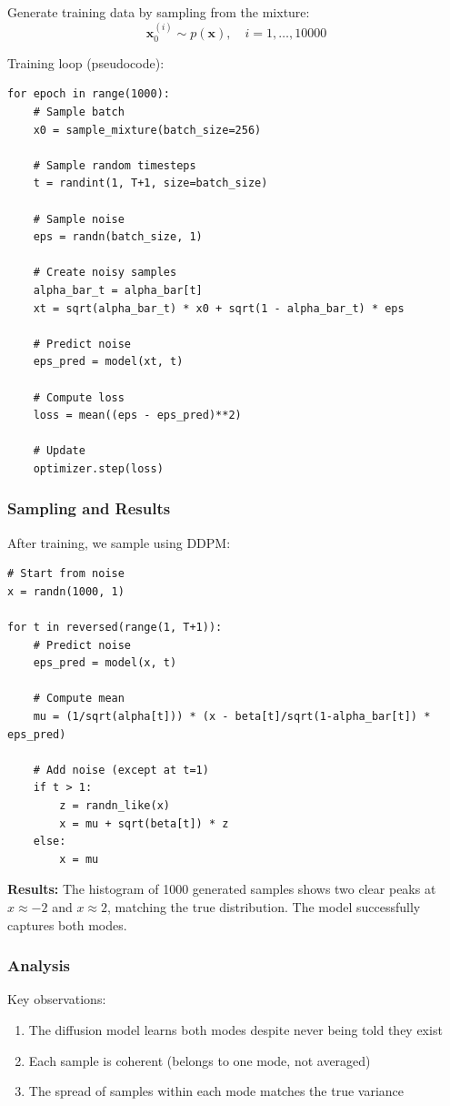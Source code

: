 Generate training data by sampling from the mixture:
\begin{equation}
\mathbf{x}_0^{(i)} \sim p(\mathbf{x}), \quad i = 1, \ldots, 10000
\label{eq:example1_data}
\end{equation}

Training loop (pseudocode):
\begin{verbatim}
for epoch in range(1000):
    # Sample batch
    x0 = sample_mixture(batch_size=256)

    # Sample random timesteps
    t = randint(1, T+1, size=batch_size)

    # Sample noise
    eps = randn(batch_size, 1)

    # Create noisy samples
    alpha_bar_t = alpha_bar[t]
    xt = sqrt(alpha_bar_t) * x0 + sqrt(1 - alpha_bar_t) * eps

    # Predict noise
    eps_pred = model(xt, t)

    # Compute loss
    loss = mean((eps - eps_pred)**2)

    # Update
    optimizer.step(loss)
\end{verbatim}

\subsubsection{Sampling and Results}

After training, we sample using DDPM:

\begin{verbatim}
# Start from noise
x = randn(1000, 1)

for t in reversed(range(1, T+1)):
    # Predict noise
    eps_pred = model(x, t)

    # Compute mean
    mu = (1/sqrt(alpha[t])) * (x - beta[t]/sqrt(1-alpha_bar[t]) * eps_pred)

    # Add noise (except at t=1)
    if t > 1:
        z = randn_like(x)
        x = mu + sqrt(beta[t]) * z
    else:
        x = mu
\end{verbatim}

\textbf{Results:} The histogram of 1000 generated samples shows two clear peaks at $x \approx -2$ and $x \approx 2$, matching the true distribution. The model successfully captures both modes.

\subsubsection{Analysis}

Key observations:
\begin{enumerate}
    \item The diffusion model learns both modes despite never being told they exist
    \item Each sample is coherent (belongs to one mode, not averaged)
    \item The spread of samples within each mode matches the true variance
\end{enumerate}

